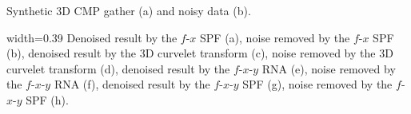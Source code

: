 
 {Synthetic 3D
  CMP gather (a) and noisy data (b).}

{width=0.39\columnwidth} {Denoised result by the $f$-$x$ SPF (a),
  noise removed by the $f$-$x$ SPF (b), denoised result by the 3D
  curvelet transform (c), noise removed by the 3D curvelet transform
  (d), denoised result by the $f$-$x$-$y$ RNA (e), noise removed by
  the $f$-$x$-$y$ RNA (f), denoised result by the $f$-$x$-$y$ SPF (g),
  noise removed by the $f$-$x$-$y$ SPF (h).}

\begin{table}[!t]
    \caption{
        Comparison of the SNR and time consumption
        among different methods.}
    \label{tbl:cost2}
    \centering
\end{table}
